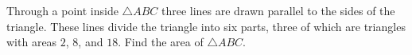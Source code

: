 Through a point inside $\triangle ABC$ three lines are drawn parallel to the sides of the triangle. These lines divide the triangle into six parts, three of which are triangles with areas $2$, $8$, and $18$. Find the area of $\triangle ABC$.
